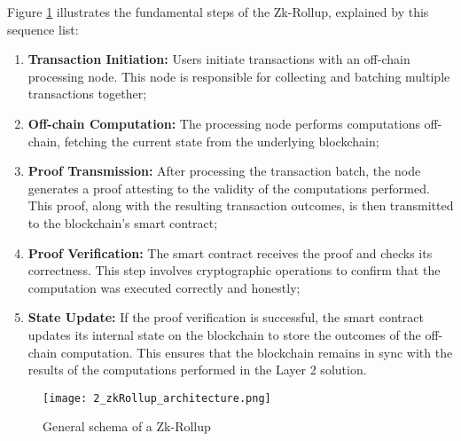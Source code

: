 Figure \ref{fig:3_zkRollup_schema} illustrates the fundamental steps of the Zk-Rollup, explained by this sequence list:
\begin{enumerate}
  \item \textbf{Transaction Initiation:} Users initiate transactions with an off-chain processing node. This node is responsible for collecting and batching multiple transactions together;
  \item \textbf{Off-chain Computation:} The processing node performs computations off-chain, fetching the current state from the underlying blockchain;
  \item \textbf{Proof Transmission:} After processing the transaction batch, the node generates a proof attesting to the validity of the computations performed. This proof, along with the resulting transaction outcomes, is then transmitted to the blockchain's smart contract;
  \item \textbf{Proof Verification:} The smart contract receives the proof and checks its correctness. This step involves cryptographic operations to confirm that the computation was executed correctly and honestly;
  \item \textbf{State Update:} If the proof verification is successful, the smart contract updates its internal state on the blockchain to store the outcomes of the off-chain computation. This ensures that the blockchain remains in sync with the results of the computations performed in the Layer 2 solution.
\end{enumerate}

\begin{figure}[ht]
  \centering
  \texttt{[image: 2\_zkRollup\_architecture.png]}
  \caption[Zk-Rollup Schema]{General schema of a Zk-Rollup\cite{ise_department_tub_material_nodate}}  
  \label{fig:3_zkRollup_schema}
\end{figure}

